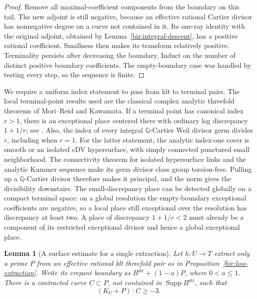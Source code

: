 \documentclass[11pt,letterpaper]{article}
\newcommand{\Q}{\mathbb{Q}}
\DeclareMathOperator{\Supp}{Supp}
\newtheorem{lemma}[theorem]{Lemma}
\theoremstyle{definition}
\theoremstyle{remark}
\begin{document}
\begin{proof}
Remove all maximal-coefficient components from the boundary on this
tail.  The new adjoint is still negative, because an effective
rational Cartier divisor has nonnegative degree on a curve not
contained in it.  Its one-ray identity with the original adjoint,
obtained by Lemma~\ref{bir:integral-descent}, has a positive rational
coefficient.  Smallness then makes its transform relatively positive.
Terminality persists after decreasing the boundary.  Induct on the
number of distinct positive boundary coefficients.  The empty-boundary
case was handled by testing every step, so the sequence is finite.
\end{proof}

We require a uniform index statement to pass from klt to terminal
pairs.  The local terminal-point results used are the classical
complex analytic threefold theorems of Mori--Reid and Kawamata.  If a
terminal point has canonical index $r>1$, there is an exceptional
place centered there with ordinary log discrepancy $1+1/r$; see
\cite{KawamataTerminalDiscrepancy}.  Also, the index of every integral
$\Q$-Cartier Weil divisor germ divides $r$, including when $r=1$.
For the latter statement, the analytic index-one cover is smooth or
an isolated cDV hypersurface, with simply connected punctured small
neighborhood.  The connectivity theorem for isolated hypersurface
links and the analytic Kummer sequence make its germ divisor class
group torsion-free.  Pulling up a $\Q$-Cartier divisor therefore makes
it principal, and the norm gives the divisibility downstairs.  The
small-discrepancy place can be detected globally on a compact
terminal space: on a global resolution the empty-boundary exceptional
coefficients are negative, so a local place still exceptional over
the resolution has discrepancy at least two.  A place of discrepancy
$1+1/r<2$ must already be a component of its restricted exceptional
divisor and hence a global exceptional place.

\begin{lemma}[A surface estimate for a single extraction]
\label{bir:surface-estimate}
Let $h:U\to T$ extract only a prime $P$ from an effective rational
klt threefold pair as in Proposition~\ref{bir:low-extraction}.  Write
its crepant boundary as $B^{\mathrm{str}}+(1-a)P$, where $0<a\leq1$.
There is a contracted curve $C\subset P$, not contained in
$\Supp B^{\mathrm{str}}$, such that
\begin{equation}
 (K_U+P)\cdot C\geq-3.
 \label{bir:surface-degree}
\end{equation}
\end{lemma}
\end{document}
